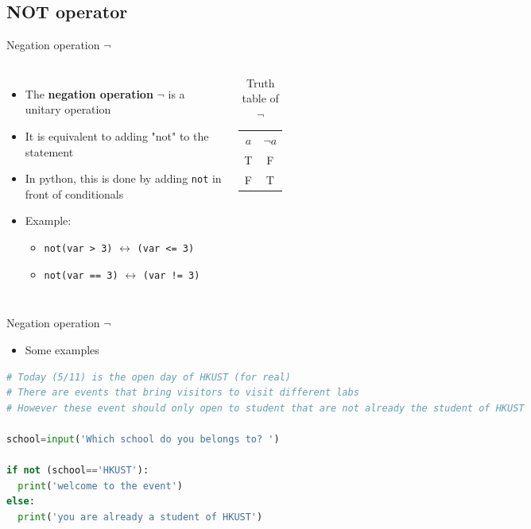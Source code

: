 \documentclass[10pt,xcolor={table,dvipsnames},t]{beamer}
\begin{document}
\subsection{NOT operator}
\begin{frame}{Negation operation $\neg$}
  \begin{columns}
    \begin{itemize}
      \item The \textbf{negation operation} $\neg$ is a unitary operation 
      \item It is equivalent to adding "not" to the statement 
      \item In python, this is done by adding \texttt{not} in front of conditionals
      \item Example:
      \begin{itemize}
        \item \texttt{not(var > 3)} $\leftrightarrow$ \texttt{(var <= 3)}
        \item \texttt{not(var == 3)} $\leftrightarrow$ \texttt{(var != 3)}
      \end{itemize}
    \end{itemize}
    \begin{table}[]
      \begin{tabular}{cc}
      $a$ & $\neg a$  \\
      T & F \\
      F & T
      \end{tabular}
      \caption{Truth table of $\neg$}
      \end{table}
  \end{columns}
\end{frame}

\begin{frame}[fragile]{Negation operation $\neg$}
  \begin{itemize}
    \item Some examples
  \end{itemize}
\begin{lstlisting}[language=python]
# Today (5/11) is the open day of HKUST (for real)
# There are events that bring visitors to visit different labs
# However these event should only open to student that are not already the student of HKUST

school=input('Which school do you belongs to? ')

if not (school=='HKUST'):
  print('welcome to the event')
else:
  print('you are already a student of HKUST')
\end{lstlisting}
\end{frame}
\end{document}
